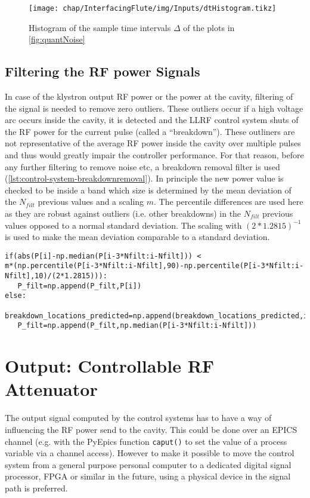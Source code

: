 \begin{figure}[tb]
\centering
\texttt{[image: chap/InterfacingFlute/img/Inputs/dtHistogram.tikz]}
\caption{Histogram of the sample time intervals $\Delta$ of the plots in \autoref{fig:quantNoise}}
\label{fig:interfacingFlute_sampleTimesHist}
\end{figure}

\subsection{Filtering the RF power Signals}
In case of the klystron output RF power or the power at the cavity, filtering of the signal is needed to remove zero outliers.
These outliers occur if a high voltage arc occurs inside the cavity, it is detected and the LLRF control system shuts of the RF power for the current pulse (called a ``breakdown'').
These outliners are not representative of the average RF power inside the cavity over multiple pulses and thus would greatly impair the controller performance.
For that reason, before any further filtering to remove noise etc, a breakdown removal filter is used (\autoref{lst:control-system-breakdownremoval}).
In principle the new power value is checked to be inside a band which size is determined by the mean deviation of the $N_{filt}$ previous values and a scaling $m$.
The percentile differences are used here as they are robust against outliers (i.e. other breakdowns) in the $N_{filt}$ previous values opposed to a normal standard deviation.
The scaling with $(2*1.2815)^{-1}$ is used to make the mean deviation comparable to a standard deviation.

\begin{lstlisting}[style=python,caption = Breakdown removal filtering, label = lst:control-system-breakdownremoval]
if(abs(P[i]-np.median(P[i-3*Nfilt:i-Nfilt])) <
m*(np.percentile(P[i-3*Nfilt:i-Nfilt],90)-np.percentile(P[i-3*Nfilt:i-Nfilt],10)/(2*1.2815))):
   P_filt=np.append(P_filt,P[i])
else:
   breakdown_locations_predicted=np.append(breakdown_locations_predicted,i)
   P_filt=np.append(P_filt,np.median(P[i-3*Nfilt:i-Nfilt]))
\end{lstlisting}





\section{Output: Controllable RF Attenuator}
The output signal computed by the control systems has to have a way of influencing the RF power send to the cavity. This could be done over an EPICS channel (e.g. with the PyEpics function \texttt{caput()} to set the value of a process variable via a channel access). However to make it possible to move the control system from a general purpose personal computer to a dedicated digital signal processor, FPGA or similar in the future, using a physical device in the signal path is preferred.\\

